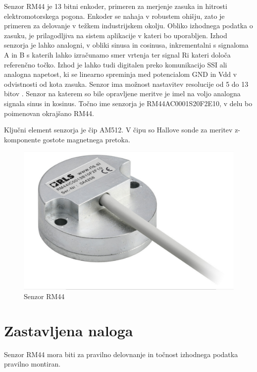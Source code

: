Senzor RM44 je 13 bitni enkoder, primeren za merjenje zasuka in hitrosti elektromotorskega pogona\cite{RM44}.
Enkoder se nahaja v robustem ohišju, zato je primeren za delovanje v težkem industrijskem okolju. %
Obliko izhodnega podatka o zasuku, je prilagodljiva na sistem aplikacije v kateri bo uporabljen\cite{Ambrozic}. Izhod senzorja je lahko analogni, v obliki sinusa in cosinusa, inkrementalni \cite{inkrementalni} s signaloma A in B s katerih lahko izračunamo smer vrtenja ter signal Ri kateri določa referenčno točko. Izhod je lahko tudi digitalen preko komunikacijo SSI ali analogna napetost, ki se linearno spreminja med potencialom GND in Vdd v odvistnosti od kota zasuka. Senzor ima možnost nastavitev resolucije od 5 do 13 bitov \cite{RM44}\cite{AM8192}. Senzor na katerem so bile opravljene meritve je imel na voljo analogna signala sinus in kosinus. Točno ime senzorja je RM44AC0001S20F2E10, v delu bo poimenovan okrajšano RM44.

Ključni element senzorja je čip AM512. V čipu so Hallove sonde za meritev z-komponente gostote magnetnega pretoka. 

\begin{figure}[h]
	\centering
	\includegraphics[width=0.8\columnwidth]{./Slike/senzorRM44.jpg}
	\caption{Senzor RM44}
	\label{RM44}
\end{figure}



\chapter{Zastavljena naloga}

Senzor RM44 mora biti za pravilno delovnanje in točnost izhodnega podatka pravilno montiran.%

